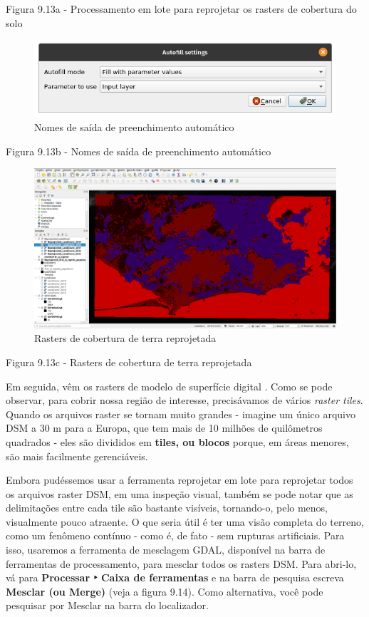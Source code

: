 \documentclass[
]{book}
\begin{document}
Figura 9.13a - Processamento em lote para reprojetar os rasters de cobertura do solo

\begin{figure}
\centering
\includegraphics{media/modulo9/fig913_b.png}
\caption{Nomes de saída de preenchimento automático}
\end{figure}

Figura 9.13b - Nomes de saída de preenchimento automático

\begin{figure}
\centering
\includegraphics{media/modulo9/fig913_c.png}
\caption{Rasters de cobertura de terra reprojetada}
\end{figure}

Figura 9.13c - Rasters de cobertura de terra reprojetada

Em seguida, vêm os rasters de modelo de superfície digital . Como se pode observar, para cobrir nossa região de interesse, precisávamos de vários \emph{raster tiles}. Quando os arquivos raster se tornam muito grandes - imagine um único arquivo DSM a 30 m para a Europa, que tem mais de 10 milhões de quilômetros quadrados - eles são divididos em \textbf{tiles, ou blocos} porque, em áreas menores, são mais facilmente gerenciáveis.

Embora pudéssemos usar a ferramenta reprojetar em lote para reprojetar todos os arquivos raster DSM, em uma inspeção visual, também se pode notar que as delimitações entre cada tile são bastante visíveis, tornando-o, pelo menos, visualmente pouco atraente. O que seria útil é ter uma visão completa do terreno, como um fenômeno contínuo - como é, de fato - sem rupturas artificiais. Para isso, usaremos a ferramenta de mesclagem GDAL, disponível na barra de ferramentas de processamento, para mesclar todos os rasters DSM. Para abri-lo, vá para \textbf{Processar ‣ Caixa de ferramentas } e na barra de pesquisa escreva \textbf{Mesclar (ou Merge)} (veja a figura 9.14). Como alternativa, você pode pesquisar por Mesclar na barra do localizador.
\end{document}
